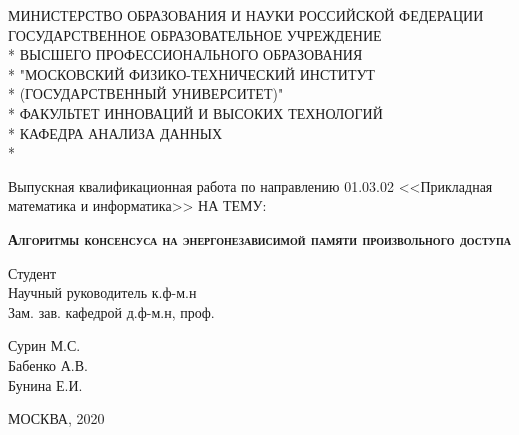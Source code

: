 \documentclass[pdftex,ptm,12pt,a4paper]{report}
\theoremstyle{definition}
\begin{document}
\begin{titlepage}
\newpage

\begin{center}
МИНИСТЕРСТВО ОБРАЗОВАНИЯ И НАУКИ РОССИЙСКОЙ ФЕДЕРАЦИИ \\
\vspace{0.5cm}
ГОСУДАРСТВЕННОЕ ОБРАЗОВАТЕЛЬНОЕ УЧРЕЖДЕНИЕ \\*
ВЫСШЕГО ПРОФЕССИОНАЛЬНОГО ОБРАЗОВАНИЯ\\*
"МОСКОВСКИЙ ФИЗИКО-ТЕХНИЧЕСКИЙ ИНСТИТУТ \\*
(ГОСУДАРСТВЕННЫЙ УНИВЕРСИТЕТ)" \\*
\vspace{0.5cm}
ФАКУЛЬТЕТ ИННОВАЦИЙ И ВЫСОКИХ ТЕХНОЛОГИЙ \\*
КАФЕДРА АНАЛИЗА ДАННЫХ \\*
\hrulefill
\end{center}


\vspace{3em}

\begin{center}
\Large Выпускная квалификационная работа по направлению 01.03.02 <<Прикладная математика и информатика>> \linebreak НА ТЕМУ:
\end{center}

\vspace{2.5em}

\begin{center}
\textsc{\large{\textbf{Алгоритмы консенсуса на энергонезависимой памяти произвольного доступа}}}
\end{center}

\vspace{6.5em}

\begin{minipage}{.45\linewidth}
\begin{flushleft}
Студент \\ Научный руководитель к.ф-м.н \\ Зам. зав. кафедрой д.ф-м.н, проф.
\end{flushleft}
\end{minipage}
\hfill
\begin{minipage}{.45\linewidth}
\begin{flushright}
    Сурин М.С.\\ Бабенко А.В.\\Бунина Е.И.
\end{flushright}
\end{minipage}

\vspace{\fill}

\begin{center}
МОСКВА, 2020
\end{center}

\end{titlepage}
\end{document}
